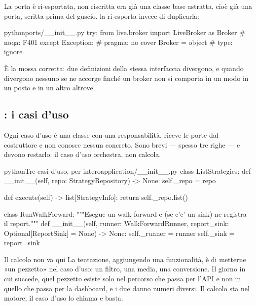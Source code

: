\begin{nota}{La porta  è ri-esportata, non riscritta}
 era già una classe base astratta, cioè già
una porta, scritta prima del guscio. \pkgPorte{} la ri-esporta invece di
duplicarla:

\begin{codiceInterno}{python}{}{ports/\_\_init\_\_.py}
try:
    from live.broker import LiveBroker as Broker  # noqa: F401
except Exception:  # pragma: no cover
    Broker = object  # type: ignore
\end{codiceInterno}

\noindent
È la mossa corretta: due definizioni della stessa interfaccia divergono, e
quando divergono nessuno se ne accorge finché un broker non si comporta in un
modo in un posto e in un altro altrove.
\end{nota}

\subsection{\pkgApplicazione: i casi d'uso}

Ogni caso d'uso è una classe con una responsabilità, riceve le porte dal
costruttore e non conosce nessun concreto. Sono brevi --- spesso tre righe --- e
devono restarlo: il caso d'uso orchestra, non calcola.

\begin{codiceInterno}{python}{Tre casi d'uso, per intero}{application/\_\_init\_\_.py}
class ListStrategies:
    def __init__(self, repo: StrategyRepository) -> None:
        self._repo = repo

    def execute(self) -> list[StrategyInfo]:
        return self._repo.list()


class RunWalkForward:
    """Esegue un walk-forward e (se c'e' un sink) ne registra il report."""
    def __init__(self, runner: WalkForwardRunner,
                 report_sink: Optional[ReportSink] = None) -> None:
        self._runner = runner
        self._sink = report_sink
\end{codiceInterno}

\begin{attenzione}{Il calcolo non va qui}
La tentazione, aggiungendo una funzionalità, è di metterne «un pezzetto» nel
caso d'uso: un filtro, una media, una conversione. Il giorno in cui succede,
quel pezzetto esiste solo nel percorso che passa per l'API e non in quello
che passa per la dashboard, e i due danno numeri diversi. Il calcolo sta nel
motore; il caso d'uso lo chiama e basta.
\end{attenzione}

